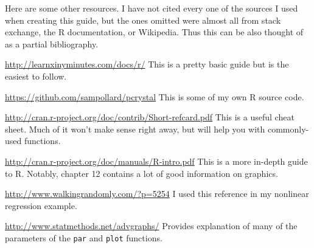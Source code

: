 \documentclass[12pt]{article}
\theoremstyle{remark}
\begin{document}
Here are some other resources. I have not cited every one of the sources I used when creating this guide, but the ones omitted were almost all from stack exchange, the R documentation, or Wikipedia. Thus this can be also thought of as a partial bibliography.
\begingroup
\renewcommand{\section}[2]{}%
\begin{thebibliography}{}
		\url{http://learnxinyminutes.com/docs/r/}
		This is a pretty basic guide but is the easiest to follow.
		
		\url{https://github.com/sampollard/pcrystal}
		This is some of my own R source code.
		
		\url{http://cran.r-project.org/doc/contrib/Short-refcard.pdf}
		This is a useful cheat sheet. Much of it won't make sense right away, but will help you with commonly-used functions.
		
		\url{http://cran.r-project.org/doc/manuals/R-intro.pdf}
		This is a more in-depth guide to R. Notably, chapter 12 contains a lot of good information on graphics.
	
		\url{http://www.walkingrandomly.com/?p=5254}
		I used this reference in my nonlinear regression example.
		
		\url{http://www.statmethods.net/advgraphs/} Provides explanation of many of the parameters of the \verb|par| and \verb|plot| functions.
\end{thebibliography}
\endgroup
\end{document}
